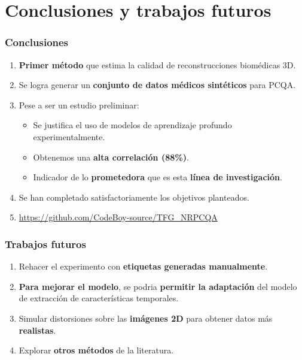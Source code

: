\section{Conclusiones y trabajos futuros}
\begin{frame}
  \frametitle{Conclusiones}
  \begin{enumerate}
    \item \textbf{Primer método} que estima la calidad de reconstrucciones biomédicas 3D.
    \item Se logra generar un \textbf{conjunto de datos médicos sintéticos } para PCQA.
    \item Pese a ser un estudio preliminar: 
      \begin{itemize}
        \item Se justifica el uso de modelos de aprendizaje profundo experimentalmente.
        \item Obtenemos una \textbf{alta correlación (88\%)}. 
        \item Indicador de lo \textbf{prometedora} que es esta \textbf{línea de investigación}.
      \end{itemize}
    \item Se han completado satisfactoriamente los objetivos planteados.
    \item \url{https://github.com/CodeBoy-source/TFG_NRPCQA} 
  \end{enumerate}
\end{frame}


\begin{frame}
  \frametitle{Trabajos futuros}
  \begin{enumerate}
    \item Rehacer el experimento con \textbf{etiquetas generadas manualmente}. 
    \item \textbf{Para mejorar el modelo}, se podria \textbf{permitir la adaptación} del modelo de extracción de características temporales.
    \item Simular distorsiones sobre las \textbf{imágenes 2D} para obtener datos más \textbf{realistas}.
    \item Explorar \textbf{otros métodos} de la literatura. 
  \end{enumerate}
\end{frame}

